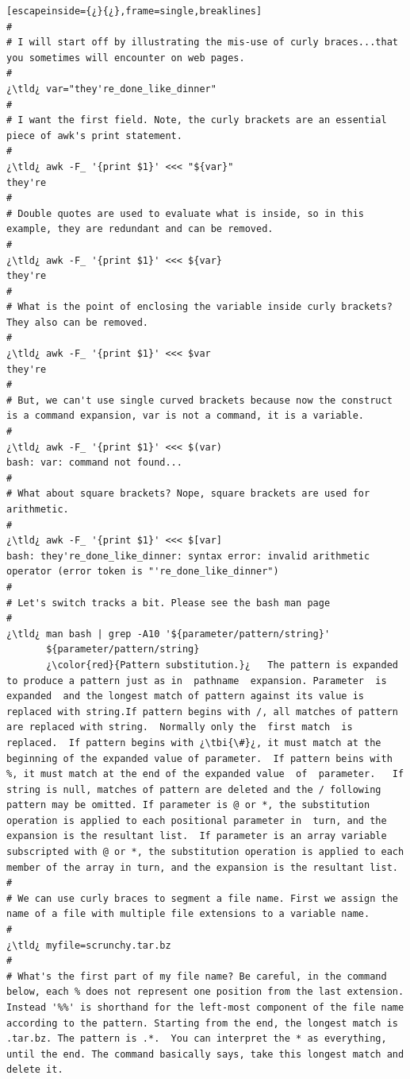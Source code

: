 \begin{lstlisting}[escapeinside={¿}{¿},frame=single,breaklines]
#
# I will start off by illustrating the mis-use of curly braces...that you sometimes will encounter on web pages.
#
¿\tld¿ var="they're_done_like_dinner"
#
# I want the first field. Note, the curly brackets are an essential piece of awk's print statement.
#
¿\tld¿ awk -F_ '{print $1}' <<< "${var}"
they're
#
# Double quotes are used to evaluate what is inside, so in this example, they are redundant and can be removed.
#
¿\tld¿ awk -F_ '{print $1}' <<< ${var}
they're
#
# What is the point of enclosing the variable inside curly brackets? They also can be removed.
#
¿\tld¿ awk -F_ '{print $1}' <<< $var
they're
#
# But, we can't use single curved brackets because now the construct is a command expansion, var is not a command, it is a variable.
#
¿\tld¿ awk -F_ '{print $1}' <<< $(var)
bash: var: command not found...
#
# What about square brackets? Nope, square brackets are used for arithmetic.
#
¿\tld¿ awk -F_ '{print $1}' <<< $[var]
bash: they're_done_like_dinner: syntax error: invalid arithmetic operator (error token is "'re_done_like_dinner")
#
# Let's switch tracks a bit. Please see the bash man page
#
¿\tld¿ man bash | grep -A10 '${parameter/pattern/string}'
       ${parameter/pattern/string}
       ¿\color{red}{Pattern substitution.}¿   The pattern is expanded to produce a pattern just as in  pathname  expansion. Parameter  is  expanded  and the longest match of pattern against its value is replaced with string.If pattern begins with /, all matches of pattern are replaced with string.  Normally only the  first match  is  replaced.  If pattern begins with ¿\tbi{\#}¿, it must match at the beginning of the expanded value of parameter.  If pattern beins with %, it must match at the end of the expanded value  of  parameter.   If string is null, matches of pattern are deleted and the / following pattern may be omitted. If parameter is @ or *, the substitution operation is applied to each positional parameter in  turn, and the expansion is the resultant list.  If parameter is an array variable subscripted with @ or *, the substitution operation is applied to each member of the array in turn, and the expansion is the resultant list.
#
# We can use curly braces to segment a file name. First we assign the name of a file with multiple file extensions to a variable name.
#
¿\tld¿ myfile=scrunchy.tar.bz
#
# What's the first part of my file name? Be careful, in the command below, each % does not represent one position from the last extension. Instead '%%' is shorthand for the left-most component of the file name according to the pattern. Starting from the end, the longest match is .tar.bz. The pattern is .*.  You can interpret the * as everything, until the end. The command basically says, take this longest match and delete it.

\end{lstlisting}
